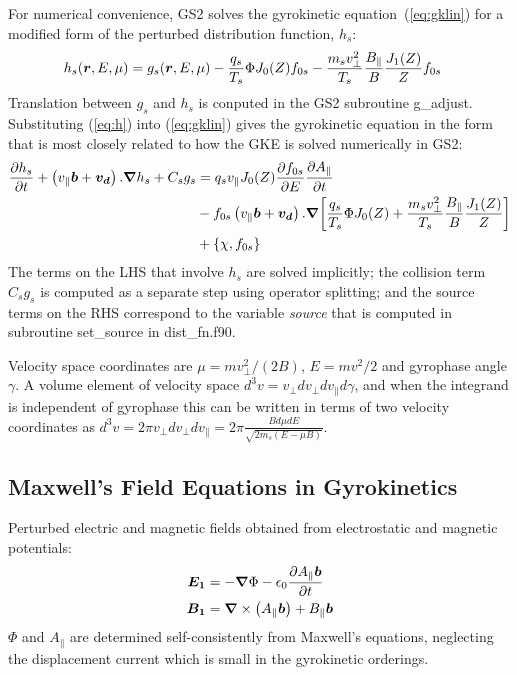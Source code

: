 \documentclass[10pt,a4paper]{article}
\newcommand{\grad}{{\bfm \nabla}}
\newcommand{\pd}[2]{\frac{\partial{#1}}{\partial{#2}} }
\newcommand{\bfm}[1]{\mbox{{\boldmath $ { #1}$}}}
\begin{document}
For numerical convenience, GS2 solves the gyrokinetic
equation~(\ref{eq:gklin}) for a modified form of the perturbed distribution
function, $h_s$:
\begin{align}
 h_s (\bfm{r}, E, \mu) & = g_s(\bfm{r}, E, \mu)  - \frac{q_s}{T_s} \Phi J_0(Z)
 f_{0s} - \frac{m_s v_{\perp}^2}{T_s} \frac{B_{\parallel}}{B} \frac{J_1(Z)}{Z}
 f_{0s} \label{eq:h}
\end{align}
Translation between $g_s$ and $h_s$ is conputed in the GS2 subroutine
g\_adjust.  Substituting (\ref{eq:h}) into (\ref{eq:gklin}) gives the
gyrokinetic equation in the form that is most closely related to how the GKE
is solved numerically in GS2:
\begin{align}
\frac{\partial h_s}{\partial t} + \left( v_{\parallel} \bfm{b} + \bfm{v_d}
\right). \grad{h_s} + C_s g_s & = q_s v_{\parallel} J_0(Z) \pd{f_{0s}}{E}
\pd{A_{\parallel}}{t}  \nonumber \\
& - f_{0s} \left( v_{\parallel} \bfm{b} + \bfm{v_d}
\right). \grad{ \left[ \frac{q_s}{T_s} \Phi J_0(Z) + \frac{m_s
      v_{\perp}^2}{T_s} \frac{B_{\parallel}}{B} \frac{J_1(Z)}{Z} \right]}
\nonumber \\
& + \left\{ \chi, f_{0s}\right\} 
\label{eq:gkl_gs2} 
\end{align}
The terms on the LHS that involve $h_s$ are solved implicitly; the collision
term $C_s g_s$ is computed as a separate step using operator splitting; and
the source terms on the RHS correspond to the variable {\em source} that is
computed in subroutine set\_source in dist\_fn.f90.

Velocity space coordinates are $\mu=mv_{\perp}^2/(2B)$, $E=mv^2/2$ and
gyrophase angle $\gamma$. A volume element of velocity space $d^3v = v_{\perp}
dv_{\perp} dv_{\parallel} d \gamma$, and when the integrand is independent of
gyrophase this can be written in terms of two velocity coordinates as $d^3v =
2\pi v_{\perp} dv_{\perp} dv_{\parallel} = 2 \pi \frac{B d \mu dE}{\sqrt{2
    m_s(E-\mu B)}}$.

\subsection{\label{Maxwell} Maxwell's Field Equations in Gyrokinetics}

Perturbed electric and magnetic fields obtained from electrostatic and
magnetic potentials:
\begin{align}
\bfm{E_1} &= -\grad{\Phi} - \epsilon_0 \pd{A_{\parallel} \bfm{b}}{t} \\
\bfm{B_1} &= \bfm{\nabla} \times \left( A_{\parallel} \bfm{b} \right) + B_{\parallel} \bfm{b} 
\end{align}
$\Phi$ and $A_{\parallel}$ are determined self-consistently from Maxwell's
equations, neglecting the displacement current which is small in the
gyrokinetic orderings.
\end{document}
